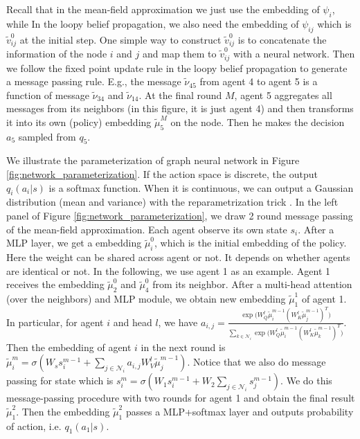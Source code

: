\documentclass[11pt,a4paper]{article}
\theoremstyle{definition}
\begin{document}
Recall that  in the mean-field approximation we just use the embedding of $\psi_i$, while In the loopy belief propagation, we also need the embedding of $\psi_{ij}$ which is $\tilde{v}_{ij}^{0}$ at the initial step. One simple way to construct $\tilde{v}_{ij}^{0}$ is to  concatenate  the information of the node $i$ and $j$ and map them to $\tilde{v}_{ij}^{0}$ with a neural network. Then we follow the fixed point update rule in the loopy belief propagation to generate a message passing rule. E.g., the message $\tilde{\nu}_{45}$ from agent 4 to agent 5 is a function of message $\tilde{\nu}_{34}$ and $\tilde{\nu}_{14}$. At the final round $M$, agent 5 aggregates all messages from its neighbors (in this figure, it is just agent 4) and then transforms it into its own (policy) embedding $\tilde{\mu}_5^M$ on the node. Then he makes the decision $a_5$ sampled from $q_5$. 







We illustrate the parameterization of graph neural network in Figure \ref{fig:network_parameterization}. If the action space is discrete, the output $q_i(a_i|s)$ is a softmax function. When it is continuous, we can output a Gaussian distribution (mean and variance) with the reparametrization trick \citep{kingma2019introduction}. In the left panel of Figure \ref{fig:network_parameterization}, we draw  2 round message passing of the mean-field approximation.  Each agent observe its own state $s_i$. After a MLP layer, we get a embedding $\tilde{\mu}^0_i$, which is the initial embedding of the policy. Here the weight can be shared across agent or not. It depends on whether agents are identical or not. In the following,  we use agent 1 as an example.  Agent 1 receives the embedding $\tilde{\mu}^0_2$ and $\tilde{\mu}^0_4$ from its neighbor. After a multi-head attention (over the neighbors) and MLP module, we obtain  new embedding $\tilde{\mu}^1_1$ of agent 1.  In particular, for  agent $i$  and head $l$, we have 
$a_{i,j} = \frac{\exp\big( W^l_Q\tilde{\mu}_i^{m-1} (W^l_K\tilde{\mu}_j^{m-1})^T\big)}{\sum_{k\in \mathcal{N}_i} \exp\big( W^l_Q\tilde{\mu}_i^{m-1} (W^l_K\tilde{\mu}_k^{m-1})^T\big)}.$  Then the embedding of agent $i$ in the next round is $ \tilde{\mu}_i^{m}=\sigma(W_s s_i^{m-1}+\sum_{j\in\mathcal{N}_i}a_{i,j} W^l_V\tilde{\mu}_j^{m-1}  ).$ Notice that we also do message passing for state which is $s_i^{m}= \sigma(W_1 s_i^{m-1} +W_2\sum_{j\in \mathcal{N}_i}s_j^{m-1})$.
We do this message-passing procedure with two rounds for agent 1 and obtain the final result $\tilde{\mu}_1^2$.   Then the embedding $\tilde{\mu}_1^2$ passes a MLP+softmax layer and outputs probability of action, i.e. $q_1(a_1|s)$.  
\end{document}

